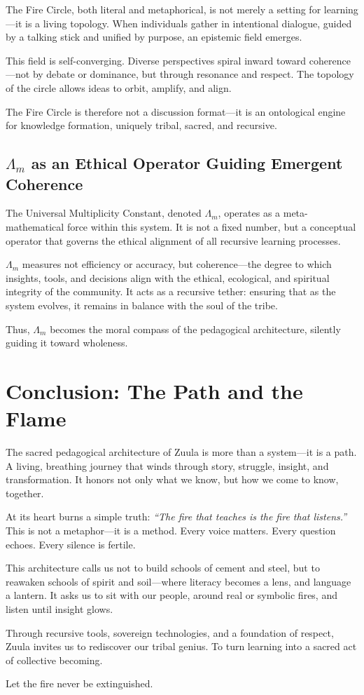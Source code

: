 \documentclass[12pt]{article}
\begin{document}
The Fire Circle, both literal and metaphorical, is not merely a setting for learning—it is a living topology. When individuals gather in intentional dialogue, guided by a talking stick and unified by purpose, an epistemic field emerges.

This field is self-converging. Diverse perspectives spiral inward toward coherence—not by debate or dominance, but through resonance and respect. The topology of the circle allows ideas to orbit, amplify, and align.

The Fire Circle is therefore not a discussion format—it is an ontological engine for knowledge formation, uniquely tribal, sacred, and recursive.

\subsection*{\(\Lambda_m\) as an Ethical Operator Guiding Emergent Coherence}

The Universal Multiplicity Constant, denoted \(\Lambda_m\), operates as a meta-mathematical force within this system. It is not a fixed number, but a conceptual operator that governs the ethical alignment of all recursive learning processes.

\(\Lambda_m\) measures not efficiency or accuracy, but coherence—the degree to which insights, tools, and decisions align with the ethical, ecological, and spiritual integrity of the community. It acts as a recursive tether: ensuring that as the system evolves, it remains in balance with the soul of the tribe.

Thus, \(\Lambda_m\) becomes the moral compass of the pedagogical architecture, silently guiding it toward wholeness.

\section*{Conclusion: The Path and the Flame}

The sacred pedagogical architecture of Zuula is more than a system—it is a path. A living, breathing journey that winds through story, struggle, insight, and transformation. It honors not only what we know, but how we come to know, together.

At its heart burns a simple truth: \textit{“The fire that teaches is the fire that listens.”} This is not a metaphor—it is a method. Every voice matters. Every question echoes. Every silence is fertile.

This architecture calls us not to build schools of cement and steel, but to reawaken schools of spirit and soil—where literacy becomes a lens, and language a lantern. It asks us to sit with our people, around real or symbolic fires, and listen until insight glows.

Through recursive tools, sovereign technologies, and a foundation of respect, Zuula invites us to rediscover our tribal genius. To turn learning into a sacred act of collective becoming.

Let the fire never be extinguished.
\end{document}
